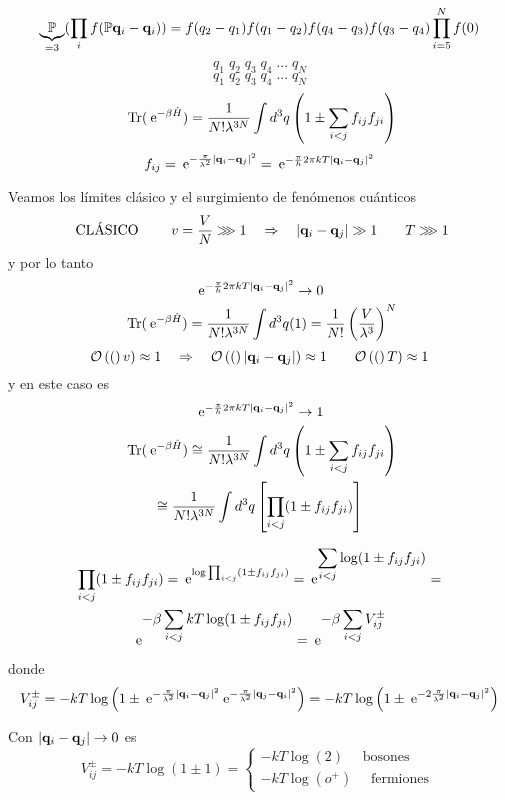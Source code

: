 \documentclass[10pt,oneside]{CBFT_book}
\begin{document}
\[
	\underbrace{\mathbb{P}}_{=3} (\prod_i f( \mathbb{P}\vb{q}_i - \vb{q}_i ) ) =
	f( {q}_2 - {q}_1 ) f( {q}_1 - {q}_2 ) f( {q}_4 - {q}_3 ) f( {q}_3 - {q}_4 ) 
	\prod_{i=5}^N f(0)
\]
\[
	q_1 \; q_2 \; q_3 \; q_4 \; ... \; q_N
\]
\[
	q_1 \; q_2 \; q_3 \; q_4 \; ... \; q_N
\]
\[
	\text{ Tr} (\:\mathrm{e}^{-\beta\hat{H}}) = \frac{1}{N!\lambda^{3N}} \int d^{3}q 
	\left( 1 \pm \sum_{i<j} f_{ij} f_{ji}  \right)
\]
\[
	f_{ij} = \euler^{ -\frac{\pi}{\lambda^2} |\vb{q}_i - \vb{q}_j|^2} =
	\euler^{ -\frac{\pi}{h} 2\pi k T |\vb{q}_i - \vb{q}_j|^2}
\]

Veamos los límites clásico y el surgimiento de fenómenos cuánticos 
\[
	\text{ CLÁSICO } \qquad v = \frac{V}{N} \ggg 1 \quad \Rightarrow \quad 
	|\vb{q}_i - \vb{q}_j| \gg 1 \qquad T \ggg 1
\]
y por lo tanto
\[
	\euler^{ -\frac{\pi}{h} 2\pi k T |\vb{q}_i - \vb{q}_j|^2} \to 0
\]
\[
	\text{ Tr} (\:\mathrm{e}^{-\beta\hat{H}}) = \frac{1}{N!\lambda^{3N}} \int d^{3}q (1) =
	\frac{1}{N!}\left( \frac{ V }{ \lambda^3 } \right)^N
\]
\[
	\Or(v) \approx 1 \quad \Rightarrow \quad \Or(|\vb{q}_i - \vb{q}_j|) \approx 1 \qquad
	\Or(T) \approx 1
\]
y en este caso es
\[
	\euler^{ -\frac{\pi}{h} 2\pi k T |\vb{q}_i - \vb{q}_j|^2} \to 1
\]
\begin{multline*}
	\text{ Tr} (\:\mathrm{e}^{-\beta\hat{H}}) \cong \frac{1}{N!\lambda^{3N}} \int d^{3}q 
	\left( 1 \pm \sum_{i<j} f_{ij} f_{ji}  \right) \\ 
	\cong \frac{1}{N!\lambda^{3N}} \int d^{3}q 
	\left[ \prod_{i<j} (1 \pm f_{ij} f_{ji} ) \right] 
\end{multline*}

\begin{multline*}
	\prod_{i<j} ( 1 \pm f_{ij}f_{ji}) = \displaystyle \:\mathrm{e}^{\log \prod_{i<j} ( 1 \pm f_{ij}f_{ji}) } =
	\:\mathrm{e}^{\displaystyle \sum_{i<j} \log ( 1 \pm f_{ij}f_{ji}) } = \\
	\:\mathrm{e}^{\displaystyle -\beta \sum_{i<j}  kT \log ( 1 \pm f_{ij}f_{ji}) } =
	\:\mathrm{e}^{\displaystyle -\beta \sum_{i<j}  V_{ij}^{\pm} }
\end{multline*}
donde 
\[
	V_{ij}^{\pm} = -kT\log \left( 1 \pm \euler^{-\frac{\pi}{\lambda^2}|\vb{q}_i - \vb{q}_j|^2} 
	\euler^{-\frac{\pi}{\lambda^2}|\vb{q}_j - \vb{q}_i|^2} \right) =
	-kT\log \left( 1 \pm  \euler^{-2\frac{\pi}{\lambda^2}|\vb{q}_i - \vb{q}_j|^2} \right)
\]

Con $ | \vb{q}_i - \vb{q}_j| \to 0 $ es
\[
	V_{ij}^{\pm} = -kT\log ( 1 \pm 1 ) = \begin{cases}
	                                           -kT\log (2) \quad \text{ bosones } \\
	                                           -kT\log (o^+) \quad \text{ fermiones } 
	                                          \end{cases}
\]
\end{document}

